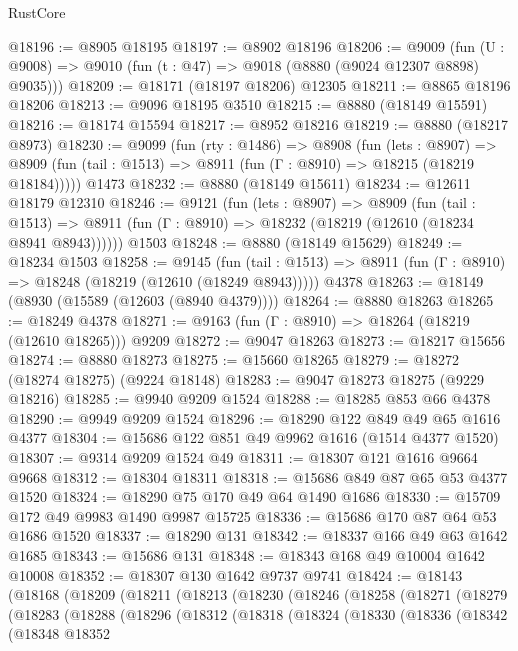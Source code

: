 \begin{lexlean}{RustCore}
\begin{coremodule}
@18196 := @8905 @18195
@18197 := @8902 @18196
@18206 := @9009
    (fun (U : @9008) => @9010 (fun (t : @47) => @9018 (@8880 (@9024 @12307 @8898) @9035)))
@18209 := @18171 (@18197 @18206) @12305
@18211 := @8865 @18196 @18206
@18213 := @9096 @18195 @3510
@18215 := @8880 (@18149 @15591)
@18216 := @18174 @15594
@18217 := @8952 @18216
@18219 := @8880 (@18217 @8973)
@18230 := @9099
    (fun (rty : @1486) =>
    @8908
      (fun (lets : @8907) =>
      @8909 (fun (tail : @1513) => @8911 (fun (Γ : @8910) => @18215 (@18219 @18184)))))
    @1473
@18232 := @8880 (@18149 @15611)
@18234 := @12611 @18179 @12310
@18246 := @9121
    (fun (lets : @8907) =>
    @8909
      (fun (tail : @1513) =>
      @8911 (fun (Γ : @8910) => @18232 (@18219 (@12610 (@18234 @8941 @8943))))))
    @1503
@18248 := @8880 (@18149 @15629)
@18249 := @18234 @1503
@18258 := @9145
    (fun (tail : @1513) => @8911 (fun (Γ : @8910) => @18248 (@18219 (@12610 (@18249 @8943)))))
    @4378
@18263 := @18149 (@8930 (@15589 (@12603 (@8940 @4379))))
@18264 := @8880 @18263
@18265 := @18249 @4378
@18271 := @9163 (fun (Γ : @8910) => @18264 (@18219 (@12610 @18265))) @9209
@18272 := @9047 @18263
@18273 := @18217 @15656
@18274 := @8880 @18273
@18275 := @15660 @18265
@18279 := @18272 (@18274 @18275) (@9224 @18148)
@18283 := @9047 @18273 @18275 (@9229 @18216)
@18285 := @9940 @9209 @1524
@18288 := @18285 @853 @66 @4378
@18290 := @9949 @9209 @1524
@18296 := @18290 @122 @849 @49 @65 @1616 @4377
@18304 := @15686 @122 @851 @49 @9962 @1616 (@1514 @4377 @1520)
@18307 := @9314 @9209 @1524 @49
@18311 := @18307 @121 @1616 @9664 @9668
@18312 := @18304 @18311
@18318 := @15686 @849 @87 @65 @53 @4377 @1520
@18324 := @18290 @75 @170 @49 @64 @1490 @1686
@18330 := @15709 @172 @49 @9983 @1490 @9987 @15725
@18336 := @15686 @170 @87 @64 @53 @1686 @1520
@18337 := @18290 @131
@18342 := @18337 @166 @49 @63 @1642 @1685
@18343 := @15686 @131
@18348 := @18343 @168 @49 @10004 @1642 @10008
@18352 := @18307 @130 @1642 @9737 @9741
@18424 := @18143
    (@18168
      (@18209
        (@18211
          (@18213
            (@18230
              (@18246
                (@18258
                  (@18271
                    (@18279
                      (@18283
                        (@18288
                          (@18296
                            (@18312
                              (@18318
                                (@18324
                                  (@18330
                                    (@18336
                                      (@18342
                                        (@18348
                                          @18352

\end{coremodule}
\end{lexlean}
